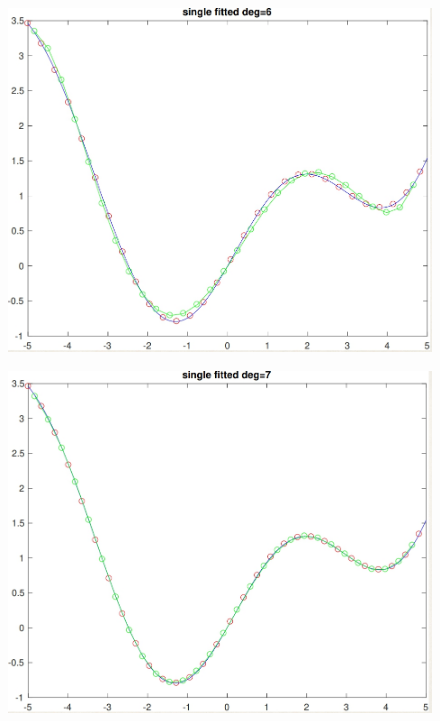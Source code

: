 \begin{figure}[h!]
\centering\includegraphics[scale=0.3]{clean_poly_d_6.png}
\end{figure}


\begin{figure}[h!]
\centering\includegraphics[scale=0.3]{clean_poly_d_7.png}
\end{figure}


